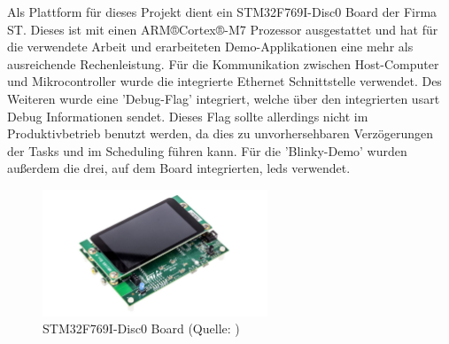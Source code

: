 \documentclass[../EDF Master Thesis.tex]{subfiles}
\begin{document}
Als Plattform für dieses Projekt dient ein STM32F769I-Disc0 Board der Firma ST.
Dieses ist mit einen ARM®Cortex®-M7 Prozessor ausgestattet und hat für die verwendete Arbeit und erarbeiteten Demo-Applikationen eine mehr als ausreichende Rechenleistung.
Für die Kommunikation zwischen Host-Computer und Mikrocontroller wurde die integrierte Ethernet Schnittstelle verwendet.
Des Weiteren wurde eine 'Debug-Flag' integriert, welche über den integrierten \ac{usart} Debug Informationen sendet.
Dieses Flag sollte allerdings nicht im Produktivbetrieb benutzt werden, da dies zu unvorhersehbaren Verzögerungen der Tasks und im Scheduling führen kann.
Für die 'Blinky-Demo' wurden außerdem die drei, auf dem Board integrierten, \ac{led}s verwendet.

\begin{figure}[ht!]
    \begin{center}
        \includegraphics[width=0.6\textwidth]{attachments/stm32f769i-disc0.pdf}
    \end{center}
    \caption[STM32F769I-Disc0 Board]{STM32F769I-Disc0 Board (Quelle: \cite{stm:001})}
    \label{fig:STM32F769I-Disc0_board}
\end{figure}
\end{document}
